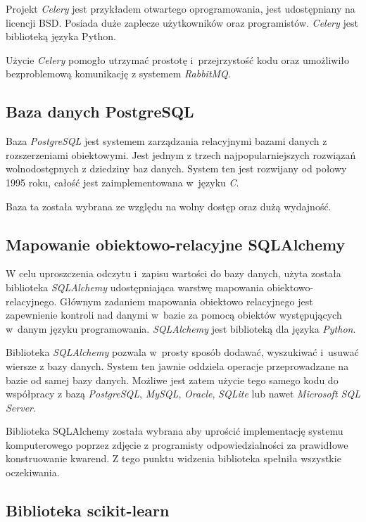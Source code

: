 \documentclass[../thesis.tex]{subfiles}
\begin{document}
Projekt \emph{Celery} jest przykładem otwartego oprogramowania, jest udostępniany na licencji BSD. Posiada duże zaplecze użytkowników oraz programistów. \emph{Celery} jest biblioteką języka Python.

Użycie \emph{Celery} pomogło utrzymać prostotę i~przejrzystość kodu oraz umożliwiło bezproblemową komunikację z systemem \emph{RabbitMQ}.

\subsection{Baza danych PostgreSQL}

Baza \emph{PostgreSQL} jest systemem zarządzania relacyjnymi bazami danych z rozszerzeniami obiektowymi. Jest jednym z trzech najpopularniejszych rozwiązań wolnodostępnych z dziedziny baz danych. System ten jest rozwijany od połowy 1995 roku, całość jest zaimplementowana w~języku \emph{C}.

Baza ta została wybrana ze względu na wolny dostęp oraz dużą wydajność.

\subsection{Mapowanie obiektowo-relacyjne SQLAlchemy}

W celu uproszczenia odczytu i~zapisu wartości do bazy danych, użyta została biblioteka \emph{SQLAlchemy} udostępniająca warstwę mapowania obiektowo-relacyjnego. Głównym zadaniem mapowania obiektowo relacyjnego jest zapewnienie kontroli nad danymi w~bazie za pomocą obiektów występujących w~danym języku programowania. \emph{SQLAlchemy} jest biblioteką dla języka \emph{Python}.

Biblioteka \emph{SQLAlchemy} pozwala w~prosty sposób dodawać, wyszukiwać i~usuwać wiersze z bazy danych. System ten jawnie oddziela operacje przeprowadzane na bazie od samej bazy danych. Możliwe jest zatem użycie tego samego kodu do współpracy z bazą \emph{PostgreSQL}, \emph{MySQL}, \emph{Oracle}, \emph{SQLite} lub nawet\emph{ Microsoft SQL Server}.


Biblioteka SQLAlchemy została wybrana aby uprościć implementację systemu komputerowego poprzez zdjęcie z programisty odpowiedzialności za prawidłowe konstruowanie kwarend. Z tego punktu widzenia biblioteka spełniła wszystkie oczekiwania.

\subsection{Biblioteka scikit-learn}
\end{document}
